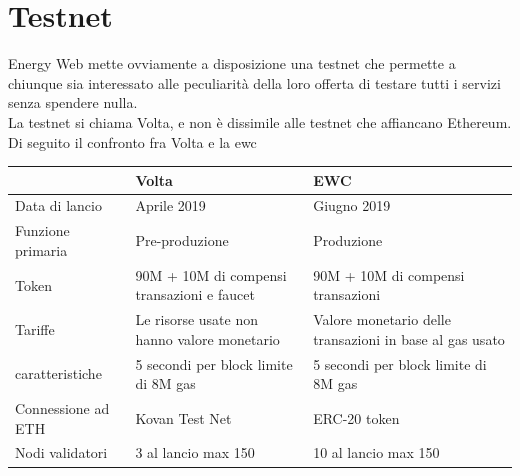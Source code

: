 \documentclass[12pt, letterpaper, twoside]{article}
\begin{document}
\section{Testnet}
Energy Web mette ovviamente a disposizione una testnet che permette a chiunque sia interessato alle peculiarità della loro offerta di testare tutti i servizi senza spendere nulla. \\
La testnet si chiama Volta, e non è dissimile alle testnet che affiancano Ethereum. \\
 
Di seguito il confronto fra Volta e la \gls{ewc}
 
\begin{tabular}{||p{4cm}|p{5cm} p{5cm}||}
    \hline
                       & Volta                                               & EWC                                                     \\ [0.5ex]
    \hline\hline
    Data di lancio     & Aprile 2019                                         & Giugno 2019                                             \\
    \hline
    Funzione primaria  & Pre-produzione                                      & Produzione                                              \\
    \hline
    Token              & 90M + 10M di compensi \newline transazioni e faucet & 90M + 10M di compensi \newline transazioni              \\
    \hline
    Tariffe            & Le risorse usate non hanno valore monetario         & Valore monetario delle transazioni in base al gas usato \\
    \hline
    caratteristiche    & 5 secondi per block \newline limite di 8M gas       & 5 secondi per block \newline limite di 8M gas           \\
    \hline
    Connessione ad ETH & Kovan Test Net                                      & ERC-20 token                                            \\
    \hline
    Nodi validatori    & 3 al lancio \newline max 150                        & 10 al lancio \newline max 150                           \\ [1ex]
    \hline
\end{tabular}
 
\end{document}

